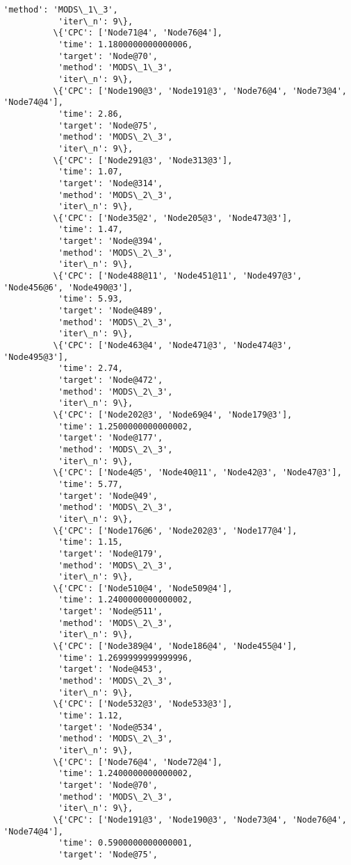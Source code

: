 \documentclass[11pt]{article}
\begin{document}
\begin{Verbatim}[commandchars=\\\{\}]
           'method': 'MODS\_1\_3',
           'iter\_n': 9\},
          \{'CPC': ['Node71@4', 'Node76@4'],
           'time': 1.1800000000000006,
           'target': 'Node@70',
           'method': 'MODS\_1\_3',
           'iter\_n': 9\},
          \{'CPC': ['Node190@3', 'Node191@3', 'Node76@4', 'Node73@4', 'Node74@4'],
           'time': 2.86,
           'target': 'Node@75',
           'method': 'MODS\_2\_3',
           'iter\_n': 9\},
          \{'CPC': ['Node291@3', 'Node313@3'],
           'time': 1.07,
           'target': 'Node@314',
           'method': 'MODS\_2\_3',
           'iter\_n': 9\},
          \{'CPC': ['Node35@2', 'Node205@3', 'Node473@3'],
           'time': 1.47,
           'target': 'Node@394',
           'method': 'MODS\_2\_3',
           'iter\_n': 9\},
          \{'CPC': ['Node488@11', 'Node451@11', 'Node497@3', 'Node456@6', 'Node490@3'],
           'time': 5.93,
           'target': 'Node@489',
           'method': 'MODS\_2\_3',
           'iter\_n': 9\},
          \{'CPC': ['Node463@4', 'Node471@3', 'Node474@3', 'Node495@3'],
           'time': 2.74,
           'target': 'Node@472',
           'method': 'MODS\_2\_3',
           'iter\_n': 9\},
          \{'CPC': ['Node202@3', 'Node69@4', 'Node179@3'],
           'time': 1.2500000000000002,
           'target': 'Node@177',
           'method': 'MODS\_2\_3',
           'iter\_n': 9\},
          \{'CPC': ['Node4@5', 'Node40@11', 'Node42@3', 'Node47@3'],
           'time': 5.77,
           'target': 'Node@49',
           'method': 'MODS\_2\_3',
           'iter\_n': 9\},
          \{'CPC': ['Node176@6', 'Node202@3', 'Node177@4'],
           'time': 1.15,
           'target': 'Node@179',
           'method': 'MODS\_2\_3',
           'iter\_n': 9\},
          \{'CPC': ['Node510@4', 'Node509@4'],
           'time': 1.2400000000000002,
           'target': 'Node@511',
           'method': 'MODS\_2\_3',
           'iter\_n': 9\},
          \{'CPC': ['Node389@4', 'Node186@4', 'Node455@4'],
           'time': 1.2699999999999996,
           'target': 'Node@453',
           'method': 'MODS\_2\_3',
           'iter\_n': 9\},
          \{'CPC': ['Node532@3', 'Node533@3'],
           'time': 1.12,
           'target': 'Node@534',
           'method': 'MODS\_2\_3',
           'iter\_n': 9\},
          \{'CPC': ['Node76@4', 'Node72@4'],
           'time': 1.2400000000000002,
           'target': 'Node@70',
           'method': 'MODS\_2\_3',
           'iter\_n': 9\},
          \{'CPC': ['Node191@3', 'Node190@3', 'Node73@4', 'Node76@4', 'Node74@4'],
           'time': 0.5900000000000001,
           'target': 'Node@75',

\end{Verbatim}
\end{document}
